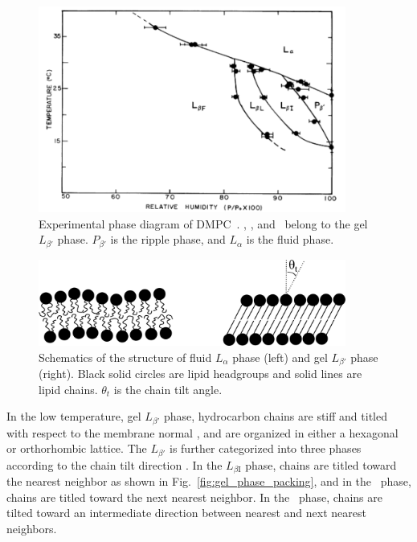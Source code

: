 \begin{figure}[htbp]
  \centering
  \includegraphics[width=0.9\textwidth]{figures/smith_phase_diagram}
  \caption{Experimental phase diagram of DMPC~\cite{ref:Smith88}.
  \LbetaI, \LbetaL, and \LbetaF\ belong to the gel $L_{\beta'}$ phase. $P_{\beta'}$ is 
  the ripple phase, and $L_\alpha$ is the fluid phase.}
  \label{fig:phase_diagram}
\end{figure}

\begin{figure}[htbp]
  \centering
  \includegraphics[width=0.9\textwidth]{figures/various_phases}
  \caption[]{Schematics of the structure of fluid $L_\alpha$ phase (left) and 
  gel $L_{\beta'}$ phase (right). Black solid circles are lipid headgroups 
  and solid lines are lipid chains. $\theta_t$ is the chain tilt angle.}
  \label{fig:various_phases}
\end{figure}

In the low temperature, gel $L_{\beta'}$
phase, hydrocarbon chains are stiff and titled with respect to the membrane
normal \cite{ref:Tardieu73}, and are organized in either a hexagonal 
or orthorhombic lattice. 
The $L_{\beta'}$ is further categorized into three phases according to the 
chain tilt direction \cite{ref:Smith88,ref:Tristram93,Tristram-Nagle02}. 
In the $L_{\beta\text{I}}$ phase, chains are titled toward the 
nearest neighbor as shown in Fig.~\ref{fig:gel_phase_packing}, and
in the \LbetaF\ phase, chains are titled toward the next nearest neighbor.
In the \LbetaL\ phase, chains are tilted toward an intermediate direction
between nearest and next nearest neighbors.

